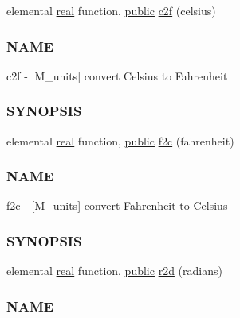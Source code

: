 \begin{DoxyCompactItemize}
\item 
elemental \hyperlink{read__watch_83_8txt_abdb62bde002f38ef75f810d3a905a823}{real} function, \hyperlink{M__stopwatch_83_8txt_a2f74811300c361e53b430611a7d1769f}{public} \hyperlink{namespacem__units_a652a2565824ce7cbc692b563054ffa3e}{c2f} (celsius)
\begin{DoxyCompactList}\small\item\em \subsubsection*{N\+A\+ME}

c2f -\/ \mbox{[}M\+\_\+units\mbox{]} convert Celsius to Fahrenheit \subsubsection*{S\+Y\+N\+O\+P\+S\+IS}\end{DoxyCompactList}\item 
elemental \hyperlink{read__watch_83_8txt_abdb62bde002f38ef75f810d3a905a823}{real} function, \hyperlink{M__stopwatch_83_8txt_a2f74811300c361e53b430611a7d1769f}{public} \hyperlink{namespacem__units_a8f71442bfefc89e6e4636f3a4677b796}{f2c} (fahrenheit)
\begin{DoxyCompactList}\small\item\em \subsubsection*{N\+A\+ME}

f2c -\/ \mbox{[}M\+\_\+units\mbox{]} convert Fahrenheit to Celsius \subsubsection*{S\+Y\+N\+O\+P\+S\+IS}\end{DoxyCompactList}\item 
elemental \hyperlink{read__watch_83_8txt_abdb62bde002f38ef75f810d3a905a823}{real} function, \hyperlink{M__stopwatch_83_8txt_a2f74811300c361e53b430611a7d1769f}{public} \hyperlink{namespacem__units_a2fbd26061a0f20c800791796ce183475}{r2d} (radians)
\begin{DoxyCompactList}\small\item\em \subsubsection*{N\+A\+ME}


\end{DoxyCompactList}
\end{DoxyCompactItemize}
